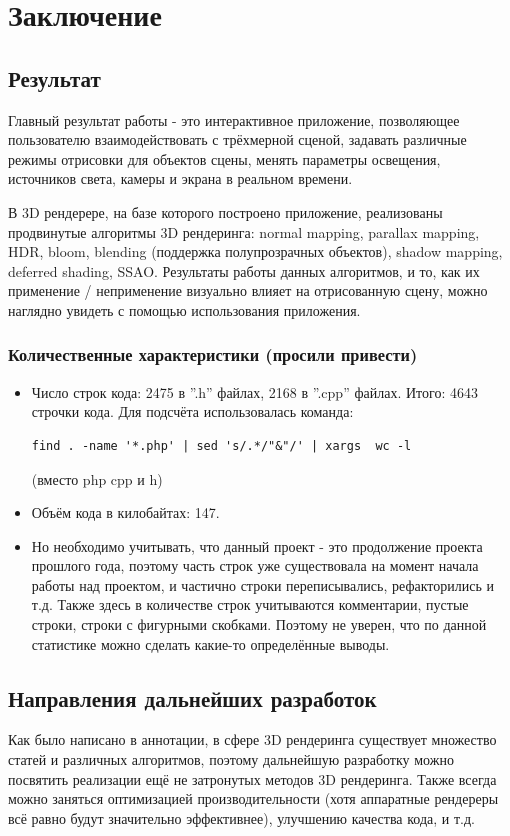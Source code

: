 \documentclass[14pt]{extarticle}
\begin{document}
\section{Заключение}
\subsection{Результат}
Главный результат работы - это интерактивное приложение, позволяющее пользователю взаимодействовать с трёхмерной сценой, задавать различные режимы отрисовки для объектов сцены, менять параметры освещения, источников света, камеры и экрана в реальном времени. 

В 3D рендерере, на базе которого построено приложение, реализованы продвинутые алгоритмы 3D рендеринга: normal mapping, parallax mapping, HDR, bloom, blending (поддержка полупрозрачных объектов), shadow mapping, deferred shading, SSAO. Результаты работы данных алгоритмов, и то, как их применение / неприменение визуально влияет на отрисованную сцену, можно наглядно увидеть с помощью использования приложения. 
\subsubsection{Количественные характеристики (просили привести)}
\begin{itemize}
	\item Число строк кода: 2475 в ''.h'' файлах, 2168 в ''.cpp'' файлах. Итого: 4643 строчки кода. Для подсчёта использовалась команда: \begin{verbatim}find . -name '*.php' | sed 's/.*/"&"/' | xargs  wc -l
	\end{verbatim}
	(вместо php cpp и h)
	\item Объём кода в килобайтах: 147.
	\item Но необходимо учитывать, что данный проект - это продолжение проекта прошлого года, поэтому часть строк уже существовала на момент начала работы над проектом, и частично строки переписывались, рефакторились и т.д. Также здесь в количестве строк учитываются комментарии, пустые строки, строки с фигурными скобками. Поэтому не уверен, что по данной статистике можно сделать какие-то определённые выводы.
\end{itemize}
\subsection{Направления дальнейших разработок}
Как было написано в аннотации, в сфере 3D рендеринга существует множество статей и различных алгоритмов, поэтому дальнейшую разработку можно посвятить реализации ещё не затронутых методов 3D рендеринга. Также всегда можно заняться оптимизацией производительности (хотя аппаратные рендереры всё равно будут значительно эффективнее), улучшению качества кода, и т.д.
\end{document}

